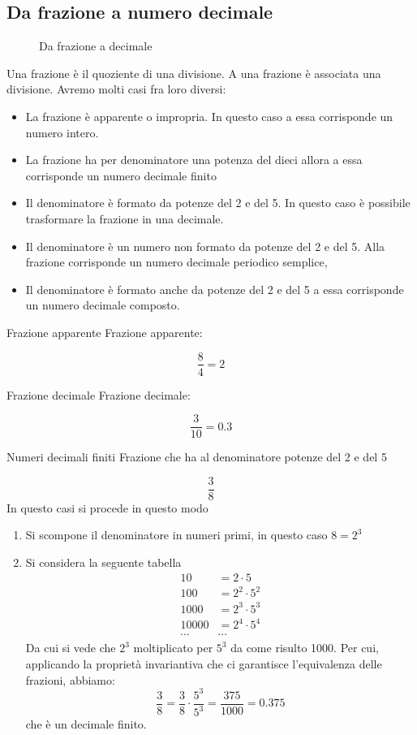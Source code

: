 \subsection{Da frazione a numero decimale}
\begin{figure}
	\centering
	
	\caption{Da frazione a decimale}
	\label{fig:DaFrazioniaDecimale}
\end{figure}
Una frazione è il quoziente di una divisione.  A una frazione è associata una divisione. Avremo molti casi fra loro diversi:
\begin{itemize}
	\item La frazione è apparente o impropria. In questo caso a essa corrisponde un numero intero.
	\item La frazione ha per denominatore una potenza del dieci allora a essa corrisponde un numero decimale finito  
	\item Il denominatore è formato da potenze del \num{2} e del \num{5}. In questo caso è possibile trasformare la frazione in una decimale.
	\item Il denominatore è un numero non formato da potenze del \num{2} e del \num{5}. Alla frazione corrisponde un numero decimale periodico semplice, 
	\item Il denominatore è formato anche da potenze del \num{2} e del \num{5} a essa corrisponde un numero decimale composto. 
\end{itemize}
\begin{esempiot}{Frazione apparente}{}
Frazione apparente: 
\end{esempiot}
\[\dfrac{8}{4}=\num{2}\]
\begin{esempiot}{Frazione decimale}{}
Frazione decimale:
\end{esempiot}
\[\dfrac{3}{10}=\num{0.3}\]
\begin{esempiot}{Numeri decimali finiti}{}
	Frazione che ha al denominatore potenze del \num{2} e del \num{5}
\end{esempiot}
\[\dfrac{3}{8}\] In questo casi si procede in questo modo\begin{enumerate}
			\item Si scompone il denominatore in numeri primi, in questo caso $8=2^3$
			\item Si considera la seguente tabella 
			\begin{align*}
			\num{10}&=2\cdot 5\\
			\num{100}&=2^2\cdot 5^2\\
			\num{1000}&=2^3\cdot 5^3\\
			\num{10000}&=2^4\cdot 5^4\\
			\cdots&\cdots
			\end{align*}
			Da cui si vede che $2^3$ moltiplicato per $5^3$ da come risulto \num{1000}. Per cui, applicando la proprietà invariantiva che ci garantisce l'equivalenza delle frazioni, abbiamo:\[\dfrac{3}{8}=\dfrac{3}{8}\cdot\dfrac{5^3}{5^3}=\dfrac{375}{1000}=\num{0,375}\] che è un decimale finito.
		\end{enumerate}
